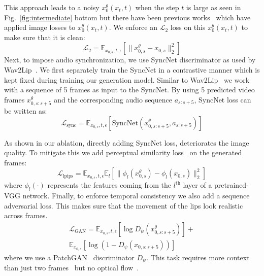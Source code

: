 This approach leads to a noisy $x^\theta_0(x_t, t)$ when the step $t$ is large as seen in Fig.~\ref{fig:intermediate} bottom but there have been previous works~\cite{piti} which have applied image losses to $x^\theta_0(x_t, t)$. We enforce an $\mathcal{L}_2$ loss on this $x^\theta_0(x_t, t)$ to make sure that it is clean:
\begin{equation}
\label{eq:L_2}
\mathcal{L}_{2}=
\mathbb{E}_{x_{0,s},t,\epsilon}[\|x^\theta_{0,s} - x_{0,s} \|_2^2]
\end{equation}
Next, to impose audio synchronization, we use SyncNet discriminator as used by Wav2Lip~\cite{wav2lip}. We first separately train the SyncNet in a contrastive manner which is kept fixed during training our generation model. Similar to Wav2Lip~\cite{wav2lip} we work with a sequence of 5 frames as input to the SyncNet. By using 5 predicted video frames $x^\theta_{0,s:s+5}$ and the corresponding audio sequence $a_{s:s+5}$, SyncNet loss can be written as:
\begin{equation}
\label{eq:L_sync}
\mathcal{L}_{\text{sync}}=\mathbb{E}_{x_{0,s},t,\epsilon}[\text{SyncNet}(x^\theta_{0,s:s+5}, a_{s:s+5} )]
\end{equation}

As shown in our ablation, directly adding SyncNet loss, deteriorates the image quality. To mitigate this we add perceptual similarity loss~\cite{lpips} on the generated frames:
\begin{equation}
\label{eq:L_lpips}
\mathcal{L}_{\text{lpips}}=\mathbb{E}_{x_{0,s},t,\epsilon}\mathbb{E}_{l}[ \|\phi_l(x^\theta_{0,s})-\phi_l(x_{0,s} )\|_2^2]
\end{equation}
where $\phi_l(\cdot)$ represents the features coming from the $l^\text{th}$ layer of a pretrained-VGG network. 
Finally, to enforce temporal consistency we also add a sequence adversarial loss. This makes sure that the movement of the lips look realistic across frames. 
\begin{equation}
\label{eq:L_gan}
\begin{aligned}
\mathcal{L}_{\text{GAN}}=\mathbb{E}_{x_{0,s},t,\epsilon}[\log D_\psi (x^\theta_{0,s:s+5})]+ \\
\mathbb{E}_{x_{0,s}}[\log(1-D_\psi(x_{0,s:s+5}))]
\end{aligned}
\end{equation}
where we use a PatchGAN~\cite{patch-gan} discriminator $D_\psi$. This task requires more context than just two frames~\cite{chan2019everybody} but no optical flow~\cite{wang2018video}.

